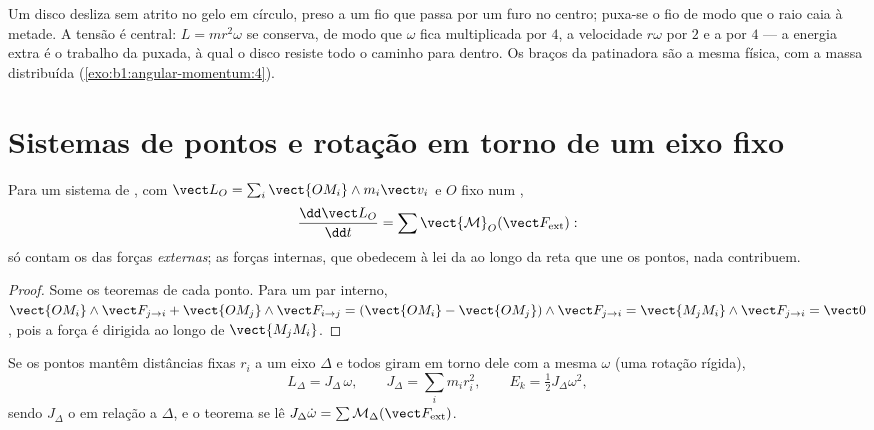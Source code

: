 \begin{example}\label{ex:b1:angular-momentum:puck}
Um disco desliza sem atrito no gelo em círculo, preso a um fio que passa por
um furo no centro; puxa-se o fio de modo que o raio caia à metade.
A tensão é central: $L = mr^2\omega$ se conserva, de modo que $\omega$ fica
multiplicada por $4$, a velocidade $r\omega$ por $2$ e a  por $4$
--- a energia extra é o trabalho da puxada, à qual o disco resiste
todo o caminho para dentro. Os braços da patinadora são a mesma física, com a massa
distribuída (\cref{exo:b1:angular-momentum:4}).
\end{example}

\section{Sistemas de pontos e rotação em torno de um eixo fixo}

\begin{theorem}\label{thm:b1:angular-momentum:system}
Para um sistema de , com $\vect L_O = \sum_i\vect{OM_i}\wedge m_i\vect v_i$
e $O$ fixo num ,
\[
\frac{\dd\vect L_O}{\dd t} = \sum\vect{\mathcal M}_O(\vect F_{\mathrm{ext}}):
\]
só contam os  das forças \emph{externas}; as forças internas,
que obedecem à lei da  ao longo da reta que une os
pontos, nada contribuem.
\end{theorem}

\begin{proof}
Some os teoremas de cada ponto. Para um par interno, $\vect{OM_i}\wedge\vect F_{j\to i}
+ \vect{OM_j}\wedge\vect F_{i\to j} = (\vect{OM_i} - \vect{OM_j})\wedge\vect F_{j\to i}
= \vect{M_jM_i}\wedge\vect F_{j\to i} = \vect 0$, pois a força é dirigida ao longo de
$\vect{M_jM_i}$.
\end{proof}

\begin{proposition}\label{prop:b1:angular-momentum:inertia}
Se os pontos mantêm distâncias fixas $r_i$ a um eixo $\Delta$ e todos
giram em torno dele com a mesma  $\omega$ (uma rotação rígida),
\[
L_\Delta = J_\Delta\,\omega, \qquad J_\Delta = \sum_i m_ir_i^2, \qquad
E_k = \tfrac12 J_\Delta\omega^2,
\]
sendo $J_\Delta$ o \emph{} em relação a $\Delta$, e o
teorema se lê $J_\Delta\dot\omega = \sum\mathcal M_\Delta(\vect F_{\mathrm{ext}})$.
\end{proposition}

